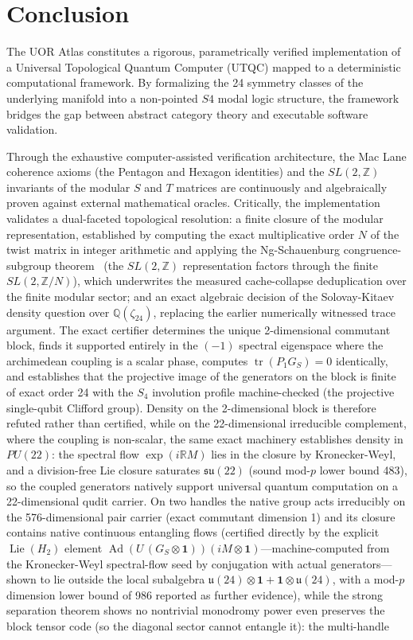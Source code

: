 \section{Conclusion}

The UOR Atlas constitutes a rigorous, parametrically verified implementation of a Universal Topological Quantum Computer (UTQC) mapped to a deterministic computational framework. By formalizing the 24 symmetry classes of the underlying manifold into a non-pointed $S4$ modal logic structure, the framework bridges the gap between abstract category theory and executable software validation.

Through the exhaustive computer-assisted verification architecture, the Mac Lane coherence axioms (the Pentagon and Hexagon identities) and the $SL(2, \mathbb{Z})$ invariants of the modular $S$ and $T$ matrices are continuously and algebraically proven against external mathematical oracles. Critically, the implementation validates a dual-faceted topological resolution: a finite closure of the modular representation, established by computing the exact multiplicative order $N$ of the twist matrix in integer arithmetic and applying the Ng-Schauenburg congruence-subgroup theorem~\cite{ngschauenburg2010} (the $SL(2, \mathbb{Z})$ representation factors through the finite $SL(2, \mathbb{Z}/N)$), which underwrites the measured cache-collapse deduplication over the finite modular sector; and an exact algebraic decision of the Solovay-Kitaev density question over $\mathbb{Q}(\zeta_{24})$, replacing the earlier numerically witnessed trace argument. The exact certifier determines the unique 2-dimensional commutant block, finds it supported entirely in the $(-1)$ spectral eigenspace where the archimedean coupling is a scalar phase, computes $\operatorname{tr}(P_1 G_S) = 0$ identically, and establishes that the projective image of the generators on the block is finite of exact order 24 with the $S_4$ involution profile machine-checked (the projective single-qubit Clifford group). Density on the 2-dimensional block is therefore refuted rather than certified, while on the 22-dimensional irreducible complement, where the coupling is non-scalar, the same exact machinery establishes density in $PU(22)$: the spectral flow $\exp(i\mathbb{R}M)$ lies in the closure by Kronecker-Weyl, and a division-free Lie closure saturates $\mathfrak{su}(22)$ (sound mod-$p$ lower bound 483), so the coupled generators natively support universal quantum computation on a 22-dimensional qudit carrier. On two handles the native group acts irreducibly on the 576-dimensional pair carrier (exact commutant dimension 1) and its closure contains native continuous entangling flows (certified directly by the explicit $\operatorname{Lie}(H_2)$ element $\operatorname{Ad}(U\,(G_S\otimes\mathbf{1}))(iM\otimes\mathbf{1})$---machine-computed from the Kronecker-Weyl spectral-flow seed by conjugation with actual generators---shown to lie outside the local subalgebra $\mathfrak{u}(24)\otimes\mathbf{1}+\mathbf{1}\otimes\mathfrak{u}(24)$, with a mod-$p$ dimension lower bound of 986 reported as further evidence), while the strong separation theorem shows no nontrivial monodromy power even preserves the block tensor code (so the diagonal sector cannot entangle it): the multi-handle 